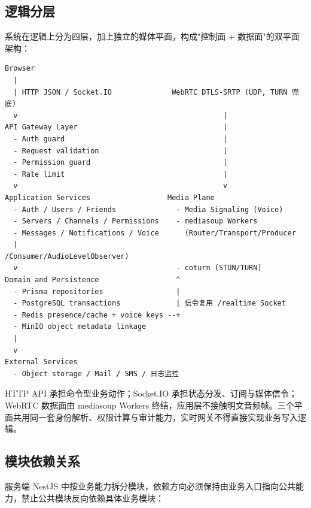 \subsection{逻辑分层}

系统在逻辑上分为四层，加上独立的媒体平面，构成"控制面 + 数据面"的双平面架构：

\begin{verbatim}
Browser
  |
  | HTTP JSON / Socket.IO              WebRTC DTLS-SRTP (UDP, TURN 兜底)
  v                                                |
API Gateway Layer                                  |
  - Auth guard                                     |
  - Request validation                             |
  - Permission guard                               |
  - Rate limit                                     |
  v                                                v
Application Services                  Media Plane
  - Auth / Users / Friends              - Media Signaling (Voice)
  - Servers / Channels / Permissions    - mediasoup Workers
  - Messages / Notifications / Voice      (Router/Transport/Producer
  |                                        /Consumer/AudioLevelObserver)
  v                                     - coturn (STUN/TURN)
Domain and Persistence                  ^
  - Prisma repositories                 |
  - PostgreSQL transactions             | 信令复用 /realtime Socket
  - Redis presence/cache + voice keys --+
  - MinIO object metadata linkage
  |
  v
External Services
  - Object storage / Mail / SMS / 日志监控
\end{verbatim}

HTTP API 承担命令型业务动作；Socket.IO 承担状态分发、订阅与媒体信令；WebRTC 数据面由 mediasoup Workers 终结，应用层不接触明文音频帧。三个平面共用同一套身份解析、权限计算与审计能力，实时网关不得直接实现业务写入逻辑。

\subsection{模块依赖关系}

服务端 NestJS 中按业务能力拆分模块，依赖方向必须保持由业务入口指向公共能力，禁止公共模块反向依赖具体业务模块：

